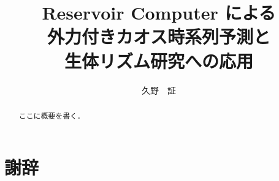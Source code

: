 \documentclass[uplatex]{suribt}
\title{Reservoir Computer による\\外力付きカオス時系列予測と\\生体リズム研究への応用}
\author{久野　証}
\begin{document}
\maketitle%

\frontmatter%
\begin{abstract}%
 ここに概要を書く．
\end{abstract}

\tableofcontents%

\mainmatter%












\backmatter%
\chapter{謝辞}%



\end{document}
